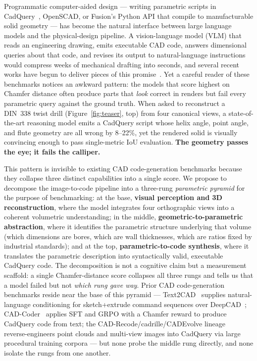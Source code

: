 \documentclass{article}
\begin{document}
Programmatic computer-aided design --- writing parametric scripts in CadQuery~\citep{CadQuerySoftware}, OpenSCAD, or Fusion's Python API that compile to manufacturable solid geometry --- has become the natural interface between large language models and the physical-design pipeline. A vision-language model (VLM) that reads an engineering drawing, emits executable CAD code, answers dimensional queries about that code, and revises its output to natural-language instructions would compress weeks of mechanical drafting into seconds, and several recent works have begun to deliver pieces of this promise~\citep{Khan2024,Guan2025,Rukhovich2025,Alrashedy2025,Kolodiazhnyi2026}. Yet a careful reader of these benchmarks notices an awkward pattern: the models that score highest on Chamfer distance often produce parts that \emph{look} correct in renders but fail every parametric query against the ground truth. When asked to reconstruct a DIN~338 twist drill (Figure~\ref{fig:teaser}, top) from four canonical views, a state-of-the-art reasoning model emits a CadQuery script whose helix angle, point angle, and flute geometry are all wrong by 8--22\%, yet the rendered solid is visually convincing enough to pass single-metric IoU evaluation. \textbf{The geometry passes the eye; it fails the calliper.}

This pattern is invisible to existing CAD code-generation benchmarks because they collapse three distinct capabilities into a single score. We propose to decompose the image-to-code pipeline into a three-rung \emph{parametric pyramid} for the purpose of benchmarking: at the base, \textbf{visual perception and 3D reconstruction}, where the model integrates four orthographic views into a coherent volumetric understanding; in the middle, \textbf{geometric-to-parametric abstraction}, where it identifies the parametric structure underlying that volume (which dimensions are bores, which are wall thicknesses, which are ratios fixed by industrial standards); and at the top, \textbf{parametric-to-code synthesis}, where it translates the parametric description into syntactically valid, executable CadQuery code. The decomposition is not a cognitive claim but a measurement scaffold: a single Chamfer-distance score collapses all three rungs and tells us that a model failed but not \emph{which rung gave way}. Prior CAD code-generation benchmarks reside near the base of this pyramid --- Text2CAD~\citep{Khan2024} supplies natural-language conditioning for sketch+extrude command sequences over DeepCAD~\citep{Wu2021}; CAD-Coder~\citep{Guan2025} applies SFT and GRPO with a Chamfer reward to produce CadQuery code from text; the CAD-Recode/cadrille/CADEvolve lineage~\citep{Rukhovich2025,Kolodiazhnyi2026,Elistratov2026} reverse-engineers point clouds and multi-view images into CadQuery via large procedural training corpora --- but none probe the middle rung directly, and none isolate the rungs from one another.
\end{document}
